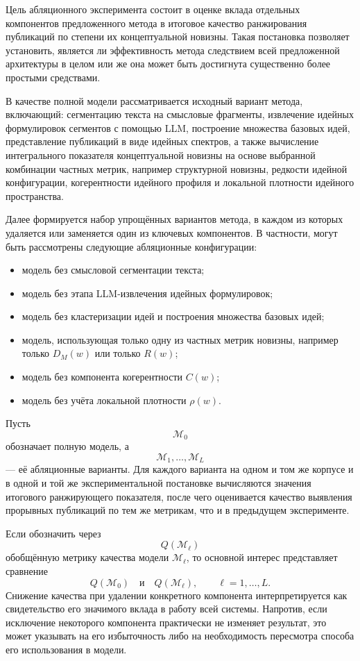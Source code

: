 \documentclass[review,3p,times]{elsarticle}
\begin{document}
Цель абляционного эксперимента состоит в оценке вклада отдельных компонентов предложенного метода в итоговое качество ранжирования публикаций по степени их концептуальной новизны. Такая постановка позволяет установить, является ли эффективность метода следствием всей предложенной архитектуры в целом или же она может быть достигнута существенно более простыми средствами.

В качестве полной модели рассматривается исходный вариант метода, включающий: сегментацию текста на смысловые фрагменты, извлечение идейных формулировок сегментов с помощью LLM, построение множества базовых идей, представление публикаций в виде идейных спектров, а также вычисление интегрального показателя концептуальной новизны на основе выбранной комбинации частных метрик, например структурной новизны, редкости идейной конфигурации, когерентности идейного профиля и локальной плотности идейного пространства.

Далее формируется набор упрощённых вариантов метода, в каждом из которых удаляется или заменяется один из ключевых компонентов. В частности, могут быть рассмотрены следующие абляционные конфигурации:
\begin{itemize}
    \item модель без смысловой сегментации текста;
    \item модель без этапа LLM-извлечения идейных формулировок;
    \item модель без кластеризации идей и построения множества базовых идей;
    \item модель, использующая только одну из частных метрик новизны, например только $D_M(w)$ или только $R(w)$;
    \item модель без компонента когерентности $C(w)$;
    \item модель без учёта локальной плотности $\rho(w)$.
\end{itemize}

Пусть
\[
\mathcal{M}_0
\]
обозначает полную модель, а
\[
\mathcal{M}_1,\dots,\mathcal{M}_L
\]
--- её абляционные варианты. Для каждого варианта на одном и том же корпусе и в одной и той же экспериментальной постановке вычисляются значения итогового ранжирующего показателя, после чего оценивается качество выявления прорывных публикаций по тем же метрикам, что и в предыдущем эксперименте.

Если обозначить через
\[
Q(\mathcal{M}_\ell)
\]
обобщённую метрику качества модели $\mathcal{M}_\ell$, то основной интерес представляет сравнение
\[
Q(\mathcal{M}_0) \quad \text{и} \quad Q(\mathcal{M}_\ell), \qquad \ell=1,\dots,L.
\]
Снижение качества при удалении конкретного компонента интерпретируется как свидетельство его значимого вклада в работу всей системы. Напротив, если исключение некоторого компонента практически не изменяет результат, это может указывать на его избыточность либо на необходимость пересмотра способа его использования в модели.
\end{document}

